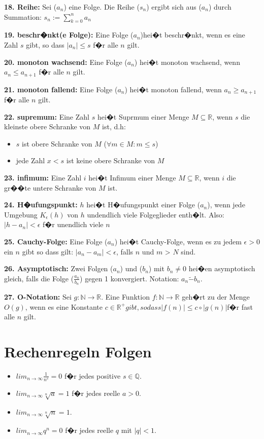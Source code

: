 \textbf{18. Reihe:} Sei ($a_n$) eine Folge. Die Reihe ($s_n$) ergibt sich aus ($a_n$) durch Summation: $s_n := \sum_{k=0}^{n} a_n$

\textbf{19. beschr�nkt(e Folge):} Eine Folge ($a_n$)hei�t beschr�nkt, wenn es eine Zahl $s$ gibt, so dass $|a_n| \leq s$ f�r alle $n$ gilt.

\textbf{20. monoton wachsend:} Eine Folge ($a_n$) hei�t monoton wachsend, wenn $a_n \leq a_{n+1}$ f�r alle $n$ gilt.

\textbf{21. monoton fallend:} Eine Folge ($a_n$) hei�t monoton fallend, wenn $a_n \geq a_{n+1}$ f�r alle $n$ gilt.

\textbf{22. supremum:} Eine Zahl $s$ hei�t Suprmum einer Menge $M \subseteq \mathbb{R}$, wenn $s$ die kleinste obere Schranke von $M$ ist, d.h:
\begin{itemize}
  \item $s$ ist obere Schranke von $M$ ($\forall m \in M : m \leq s$)
  \item jede Zahl $x < s$ ist keine obere Schranke von $M$
\end{itemize}

\textbf{23. infimum:} Eine Zahl $i$ hei�t Infimum einer Menge $M \subseteq \mathbb{R}$, wenn $i$ die gr��te untere Schranke von $M$ ist.

\textbf{24. H�ufungspunkt:} $h$ hei�t H�ufungspunkt einer Folge ($a_n$), wenn jede Umgebung $K_\epsilon (h)$ von $h$ undendlich viele Folgeglieder enth�lt. Also:\\
$|h - a_n| < \epsilon$ f�r unendlich viele $n$

\textbf{25. Cauchy-Folge:} Eine Folge ($a_n$) hei�t Cauchy-Folge, wenn es zu jedem $\epsilon > 0$ ein $n$ gibt so dass gilt: $|a_n -a_m| < \epsilon$, falls $n$ und $m$ > $N$ sind.

\textbf{26. Asymptotisch:} Zwei Folgen ($a_n$) und ($b_n$) mit $b_n \neq 0$ hei�en asymptotisch gleich, falls die Folge ($\frac{a_n}{b_n}$) gegen 1 konvergiert. Notation: $a_n \tilde{-} b_n$.

\textbf{27. O-Notation:} Sei $g : \mathbb{N} \rightarrow \mathbb{R}$. Eine Funktion $f : \mathbb{N} \rightarrow \mathbb{R}$ geh�rt zu der Menge $O(g)$, wenn es eine Konstante $c \in \mathbb{R}^+ gibt, so dass |f(n)| \leq c \circ |g(n)|$f�r fast alle $n$ gilt.
\section*{Rechenregeln Folgen}
\begin{itemize}
  \item $lim_{n\rightarrow \infty} \frac{1}{n^s} = 0$ f�r jedes positive $s \in \mathbb{Q}$.
  \item $lim_{n\rightarrow \infty} \sqrt[n]{a} = 1$ f�r jedes reelle $a > 0$.
  \item $lim_{n\rightarrow \infty} \sqrt[n]{n} = 1$.
  \item $lim_{n\rightarrow \infty} q^n = 0$ f�r jedes reelle $q$ mit $|q| < 1$.
\end{itemize}

